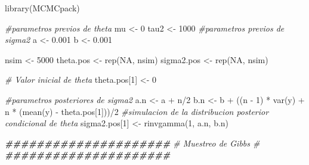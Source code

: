 \documentclass[
  10pt,
  spanish,
]{book}
\newenvironment{Shaded}{\begin{snugshade}}{\end{snugshade}}
\newcommand{\CommentTok}[1]{\textcolor[rgb]{0.56,0.35,0.01}{\textit{#1}}}
\newcommand{\ConstantTok}[1]{\textcolor[rgb]{0.00,0.00,0.00}{#1}}
\newcommand{\DecValTok}[1]{\textcolor[rgb]{0.00,0.00,0.81}{#1}}
\newcommand{\DocumentationTok}[1]{\textcolor[rgb]{0.56,0.35,0.01}{\textbf{\textit{#1}}}}
\newcommand{\FloatTok}[1]{\textcolor[rgb]{0.00,0.00,0.81}{#1}}
\newcommand{\FunctionTok}[1]{\textcolor[rgb]{0.00,0.00,0.00}{#1}}
\newcommand{\NormalTok}[1]{#1}
\newcommand{\OtherTok}[1]{\textcolor[rgb]{0.56,0.35,0.01}{#1}}
\newcommand{\SpecialCharTok}[1]{\textcolor[rgb]{0.00,0.00,0.00}{#1}}
\theoremstyle{definition}
\theoremstyle{definition}
\theoremstyle{definition}
\theoremstyle{definition}
\theoremstyle{remark}
\begin{document}
\begin{Shaded}
\begin{Highlighting}[]
\FunctionTok{library}\NormalTok{(MCMCpack)}

\CommentTok{\#parametros previos de theta}
\NormalTok{mu }\OtherTok{\textless{}{-}} \DecValTok{0}
\NormalTok{tau2 }\OtherTok{\textless{}{-}} \DecValTok{1000}
\CommentTok{\#parametros previos de sigma2}
\NormalTok{a }\OtherTok{\textless{}{-}} \FloatTok{0.001}
\NormalTok{b }\OtherTok{\textless{}{-}} \FloatTok{0.001}

\NormalTok{nsim }\OtherTok{\textless{}{-}} \DecValTok{5000}
\NormalTok{theta.pos }\OtherTok{\textless{}{-}} \FunctionTok{rep}\NormalTok{(}\ConstantTok{NA}\NormalTok{, nsim)}
\NormalTok{sigma2.pos }\OtherTok{\textless{}{-}} \FunctionTok{rep}\NormalTok{(}\ConstantTok{NA}\NormalTok{, nsim)}

\CommentTok{\# Valor inicial de theta}
\NormalTok{theta.pos[}\DecValTok{1}\NormalTok{] }\OtherTok{\textless{}{-}} \DecValTok{0}

\CommentTok{\#parametros posteriores de sigma2   }
\NormalTok{a.n }\OtherTok{\textless{}{-}}\NormalTok{ a }\SpecialCharTok{+}\NormalTok{ n}\SpecialCharTok{/}\DecValTok{2}
\NormalTok{b.n }\OtherTok{\textless{}{-}}\NormalTok{ b }\SpecialCharTok{+}\NormalTok{ ((n }\SpecialCharTok{{-}} \DecValTok{1}\NormalTok{) }\SpecialCharTok{*} \FunctionTok{var}\NormalTok{(y) }\SpecialCharTok{+}\NormalTok{ n }\SpecialCharTok{*}\NormalTok{ (}\FunctionTok{mean}\NormalTok{(y) }\SpecialCharTok{{-}}\NormalTok{ theta.pos[}\DecValTok{1}\NormalTok{]))}\SpecialCharTok{/}\DecValTok{2}
\CommentTok{\#simulacion de la distribucion posterior condicional de theta}
\NormalTok{sigma2.pos[}\DecValTok{1}\NormalTok{] }\OtherTok{\textless{}{-}} \FunctionTok{rinvgamma}\NormalTok{(}\DecValTok{1}\NormalTok{, a.n, b.n)}

\DocumentationTok{\#\#\#\#\#\#\#\#\#\#\#\#\#\#\#\#\#\#\#\#\#}
\CommentTok{\# Muestreo de Gibbs \#}
\DocumentationTok{\#\#\#\#\#\#\#\#\#\#\#\#\#\#\#\#\#\#\#\#\#}


\end{Highlighting}
\end{Shaded}
\end{document}
